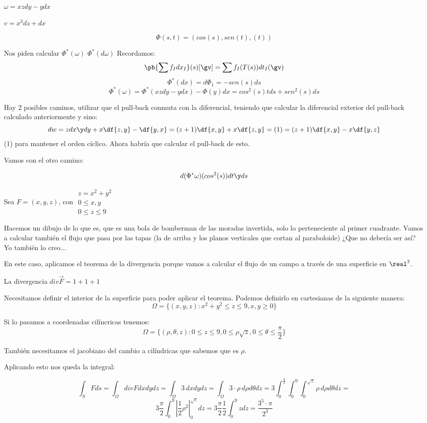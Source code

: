 \begin{problem}[9]	
$\omega = xzdy - ydx$

$v = x^3dz+dx$


\[\Phi(s,t) = (cos(s),sen(t),(t))\]

Nos piden calcular 
\ppart
$\Phi^{\ast}(\omega)$
\ppart
$\Phi^{\ast}(d\omega)$
\solution
Recordamos:
\[\pb{\sum f_Idx_I}(s)[\gv] = \sum f_I(T(s))dt_I(\gv)\]
\[\Phi^{\ast}(dx)=d\Phi_1 = -sen(s)ds\]
\spart
\[\Phi^{\ast}(\omega) = \Phi^{\ast} (xzdy - ydx) - \Phi(y)dx = cos^2(s)tds +sen^2(s)ds\]
\spart

Hay 2 posibles caminos, utilizar que el pull-back conmuta con la diferencial, teniendo que calcular la diferencial exterior del pull-back calculado anteriormente y sino:
\[dw = zdx\y dy + x\df{z,y} - \df{y,x} = (z+1)\df{x,y} + x\df{z,y} = (1) = (z+1)\df{x,y} - x\df{y,z}\]
(1) para mantener el orden cíclico.
Ahora habría que calcular el pull-back de esto.

Vamos con el otro camino:

\[d(\Phi^{\ast}\omega) (cos^2(s))dt\y ds\]
\end{problem}

\begin{problem}[17]
Sea $F = (x,y,z)$, con $\begin{array}{cc}
z = x^2+y^2\\
0\leq x,y\\
0\leq z\leq 9
\end{array}$

\solution
Hacemos un dibujo de lo que es, que es una bola de bomberman de las moradas invertida, solo lo perteneciente al primer cuadrante.
Vamos a calcular también el flujo que pasa por las tapas (la de arriba y los planos verticales que cortan al paraboloide) ¿Que no debería ser así? Yo también lo creo... 


En este caso, aplicamos el teorema de la divergencia porque vamos a calcular el flujo de un campo a través de una superficie en $\real^3$.

La divergencia $div \overrightarrow{F} = 1+1+1$

Necesitamos definir el interior de la superficie para poder aplicar el teorema. Podemos definirlo en cartesianas de la siguiente manera: \[\Omega = \{ (x,y,z): x^2+y^2\leq z\leq 9, x,y\geq 0\}\]

Si lo pasamos a coordenadas cilíncricas tenemos: \[\Omega = \{(\rho,\theta,z): 0\leq z\leq 9, 0\leq \rho \sqrt{z},0\leq\theta\leq\frac{\pi}{2}\}\]

También necesitamos el jacobiano del cambio a cilíndricas que sabemos que es $\rho$.

Aplicando esto nos queda la integral:

\[\int_S Fds =  \int_{\Omega} div F dxdydz = \int_{\Omega} 3\,dxdydz = \int_{\Omega}3\cdot\rho \,d\rho d\theta dz = 3 \int_0^{\frac{\pi}{2}} \int_0^9 \int_0^{\sqrt{z}} \rho\, d\rho d\theta dz =\]
\[
 3\frac{\pi}{2} \int_0^9 \left| \frac{1}{2} \rho^2\right|^{\sqrt{z}}_0 dz
 = 3\frac{\pi}{2} \frac{1}{2}\int_0^9 zdz = \frac{3^5\cdot \pi}{2^3}\]

\end{problem}

